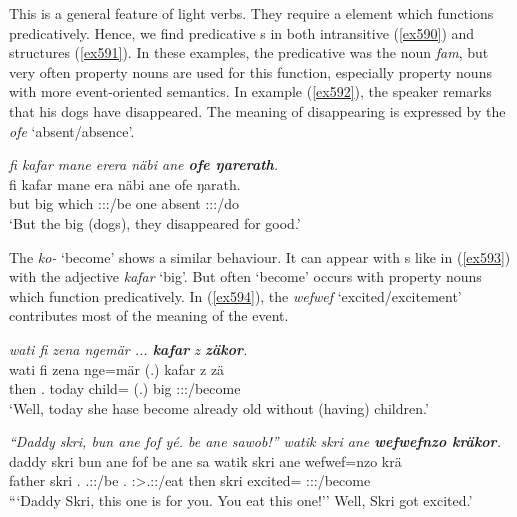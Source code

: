 This is a general feature of light verbs. They require a  element which functions predicatively. Hence, we find predicative s in both intransitive (\ref{ex590}) and  structures (\ref{ex591}). In these examples, the predicative  was the noun \emph{fam}, but very often property nouns are used for this function, especially property nouns with more event-oriented semantics. In example (\ref{ex592}), the speaker remarks that his dogs have disappeared. The meaning of disappearing is expressed by the  \emph{ofe} `absent/absence'.

\begin{exe}
	\ex \emph{fi kafar mane erera näbi ane \textbf{ofe ŋarerath}.}\\
	\gll fi kafar mane era näbi ane ofe ŋarath.\\
	but big which \Stpl:\Sbj:\Pst:\Ipfv/be one {\Dem} absent \Stpl:\Sbj:\Pst:\Ipfv/do\\
	\trans `But the big (dogs), they disappeared for good.'
	\label{ex592}
\end{exe}

The  \emph{ko-} `become' shows a similar behaviour. It can appear with s like in (\ref{ex593}) with the adjective \emph{kafar} `big'. But often `become' occurs with property nouns which function predicatively. In (\ref{ex594}), the  \emph{wefwef} `excited/excitement' contributes most of the meaning of the event.

\begin{exe}
	\ex \emph{wati fi zena ngemär ... \textbf{kafar} z \textbf{zäkor}.}\\
	\gll wati fi zena nge=mär (.) kafar z zä\\
	then \Third.{\Abs} today child={\Priv} (.) big {\Iam} \Sg:\Sbj:\Rpst:\Pfv/become\\
	\trans `Well, today she hase become already old without (having) children.'\\
	\label{ex593}
\end{exe}
\begin{exe}
	\ex \emph{``Daddy skri, bun ane fof yé. be ane sawob!'' watik skri ane \textbf{wefwefnzo kräkor}.}\\
	\gll daddy skri bun ane fof  be ane sa watik skri ane wefwef=nzo krä\\
	father skri \Ssg.{\Dat} {\Dem} {\Emph} \Tsg.\Masc:\Nonpast:\Ipfv/be \Ssg.{\Erg} {\Dem} \Ssg:\Sbj>\Tsg.\Masc:\Imp:\Pfv/eat then skri {\Dem} excited={\Only} \Stsg:\Sbj:\Irr:\Pfv/become\\
	\trans ```Daddy Skri, this one is for you. You eat this one!'' Well, Skri got excited.'\\
	\label{ex594}
\end{exe}

